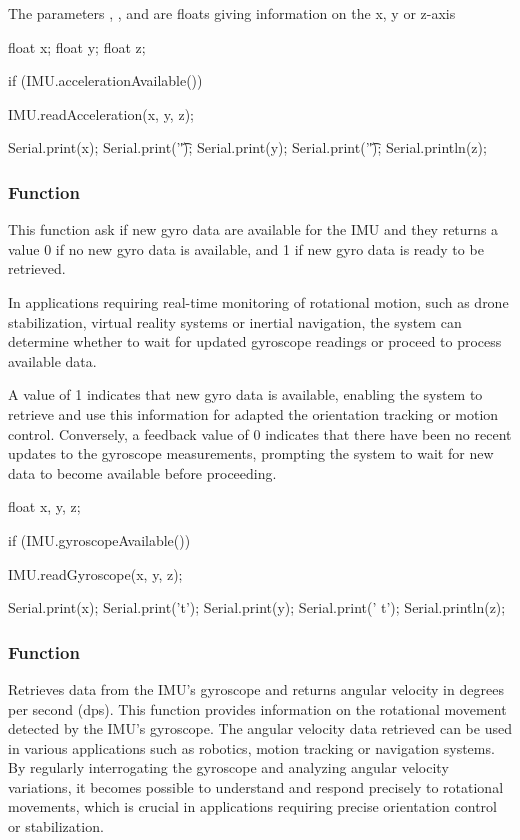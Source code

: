 The parameters , , and  are floats giving information on the x, y or z-axis 

\begin{Arduino}
	
	float x; 
	float y; 
	float z;
	
	if (IMU.accelerationAvailable()) {
		IMU.readAcceleration(x, y, z);
		
		Serial.print(x);
		Serial.print('\t');
		Serial.print(y);
		Serial.print('\t');
		Serial.println(z);	}
\end{Arduino}

\subsubsection{Function }

This function ask if new gyro data are available for the IMU and they returns a value 0 if no new gyro data is available, and 1 if new gyro data is ready to be retrieved.

In applications requiring real-time monitoring of rotational motion, such as drone stabilization, virtual reality systems or inertial navigation, the system can determine whether to wait for updated gyroscope readings or proceed to process available data.

A value of 1 indicates that new gyro data is available, enabling the system to retrieve and use this information for adapted the orientation tracking or motion control. Conversely, a feedback value of 0 indicates that there have been no recent updates to the gyroscope measurements, prompting the system to wait for new data to become available before proceeding.

\begin{Arduino}
	float x, y, z;
	
	if (IMU.gyroscopeAvailable()) {
		IMU.readGyroscope(x, y, z);
		
		Serial.print(x);
		Serial.print('t');
		Serial.print(y);
		Serial.print(' t');
		Serial.println(z); }
\end{Arduino}

\subsubsection{Function }

Retrieves data from the IMU's gyroscope and returns angular velocity in degrees per second (dps). This function provides information on the rotational movement detected by the IMU's gyroscope. The angular velocity data retrieved can be used in various applications such as robotics, motion tracking or navigation systems. By regularly interrogating the gyroscope and analyzing angular velocity variations, it becomes possible to understand and respond precisely to rotational movements, which is crucial in applications requiring precise orientation control or stabilization.

